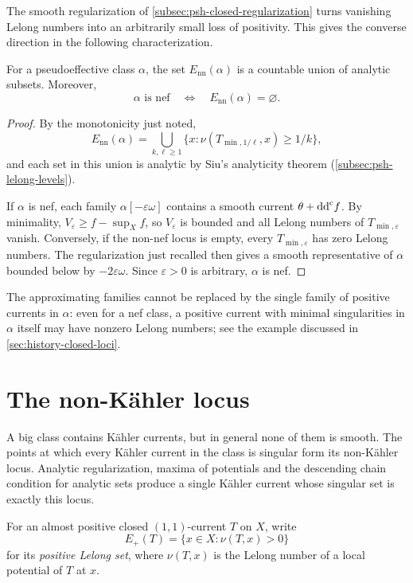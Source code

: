 The smooth regularization of \cref{subsec:psh-closed-regularization} turns vanishing Lelong numbers into an arbitrarily small loss of positivity. This gives the converse direction in the following characterization.

\begin{proposition}\label{prop:bc-non-nef}
For a pseudoeffective class $\alpha$, the set $E_{\mathrm{nn}}(\alpha)$ is a countable union of analytic subsets. Moreover,
\[
 \alpha\text{ is nef}\quad\Longleftrightarrow\quad
 E_{\mathrm{nn}}(\alpha)=\varnothing.
\]
\end{proposition}
\begin{proof}
By the monotonicity just noted,
\[
 E_{\mathrm{nn}}(\alpha)
 =\bigcup_{k,\ell\geq1}
       \{x:\nu(T_{\min,1/\ell},x)\geq1/k\},
\]
and each set in this union is analytic by Siu's analyticity theorem (\cref{subsec:psh-lelong-levels}).

If $\alpha$ is nef, each family $\alpha[-\varepsilon\omega]$ contains a smooth current $\theta+\mathrm{dd}^{\mathrm{c}} f$. By minimality, $V_\varepsilon\geq f-\sup_Xf$, so $V_\varepsilon$ is bounded and all Lelong numbers of $T_{\min,\varepsilon}$ vanish. Conversely, if the non-nef locus is empty, every $T_{\min,\varepsilon}$ has zero Lelong numbers. The regularization just recalled then gives a smooth representative of $\alpha$ bounded below by $-2\varepsilon\omega$. Since $\varepsilon>0$ is arbitrary, $\alpha$ is nef.
\end{proof}

The approximating families cannot be replaced by the single family of positive currents in $\alpha$: even for a nef class, a positive current with minimal singularities in $\alpha$ itself may have nonzero Lelong numbers; see the example discussed in \cref{sec:history-closed-loci}.

\section{The non-K\"ahler locus}
\label{sec:bc-non-kahler-locus}

A big class contains K\"ahler currents, but in general none of them is smooth. The points at which every K\"ahler current in the class is singular form its non-K\"ahler locus. Analytic regularization, maxima of potentials and the descending chain condition for analytic sets produce a single K\"ahler current whose singular set is exactly this locus.

For an almost positive closed $(1,1)$-current $T$ on $X$, write
\[
 E_+(T)=\{x\in X:\nu(T,x)>0\}
\]
for its \emph{positive Lelong set}, where $\nu(T,x)$ is the Lelong number of a local potential of $T$ at $x$.

